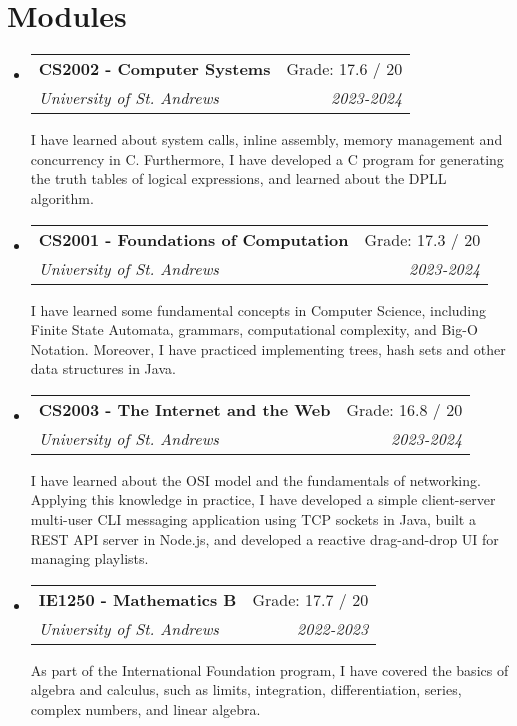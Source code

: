 \documentclass[letterpaper,11pt]{article}
\makeatletter
\newcommand{\resumeSubheading}[5]{
  \vspace{-1pt}\item
    \begin{tabular*}{0.97\textwidth}{l@{\extracolsep{\fill}}r}
      \textbf{#1} & #2 \\
      \textit{\small#3} & \textit{\small #4} \\
    \end{tabular*}
    \par{\small{#5}\vspace{-2pt}}
}
\newcommand{\resumeSubHeadingListStart}{\begin{itemize}[leftmargin=*]}
\newcommand{\resumeSubHeadingListEnd}{\end{itemize}}
\makeatother
\begin{document}
\section{Modules}
  \resumeSubHeadingListStart
    \resumeSubheading
      {CS2002 - Computer Systems}{Grade: 17.6 / 20}
      {University of St. Andrews}{2023-2024}
      { I have learned about system calls, inline assembly, memory management and concurrency in C. Furthermore, I have developed a C program for generating the truth tables of logical expressions, and learned about the DPLL algorithm. }
    \resumeSubheading
      {CS2001 - Foundations of Computation}{Grade: 17.3 / 20}
      {University of St. Andrews}{2023-2024}
      { I have learned some fundamental concepts in Computer Science, including Finite State Automata, grammars, computational complexity, and Big-O Notation. Moreover, I have practiced implementing trees, hash sets and other data structures in Java. }
    \resumeSubheading
      {CS2003 - The Internet and the Web}{Grade: 16.8 / 20}
      {University of St. Andrews}{2023-2024}
      { I have learned about the OSI model and the fundamentals of networking. Applying this knowledge in practice, I have developed a simple client-server multi-user CLI messaging application using TCP sockets in Java, built a REST API server in Node.js, and developed a reactive drag-and-drop UI for managing playlists. }
    \resumeSubheading
      {IE1250 - Mathematics B}{Grade: 17.7 / 20}
      {University of St. Andrews}{2022-2023}
      { As part of the International Foundation program, I have covered the basics of algebra and calculus, such as limits, integration, differentiation, series, complex numbers, and linear algebra.  }
   \resumeSubHeadingListEnd



\end{document}
